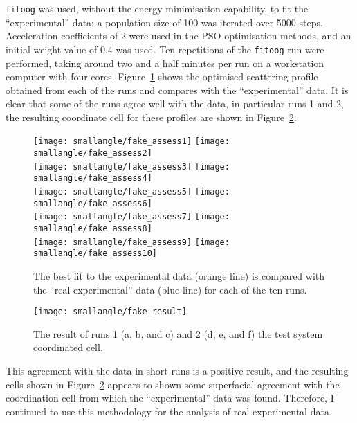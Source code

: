 \texttt{fitoog} was used, without the energy minimisation capability, to fit the ``experimental'' data; a population size of 100 was iterated over 5000 steps.
Acceleration coefficients of 2 were used in the PSO optimisation methods, and an initial weight value of 0.4 was used.
Ten repetitions of the \texttt{fitoog} run were performed, taking around two and a half minutes per run on a workstation computer with four cores.
Figure~\ref{fig:test_assess} shows the optimised scattering profile obtained from each of the runs and compares with the ``experimental'' data.
It is clear that some of the runs agree well with the data, in particular runs 1 and 2, the resulting coordinate cell for these profiles are shown in Figure~\ref{fig:fake_result}.
%
\begin{figure}
    \centering
    \texttt{[image: smallangle/fake\_assess1]}
    \texttt{[image: smallangle/fake\_assess2]} \\
    \texttt{[image: smallangle/fake\_assess3]}
    \texttt{[image: smallangle/fake\_assess4]} \\
    \texttt{[image: smallangle/fake\_assess5]}
    \texttt{[image: smallangle/fake\_assess6]} \\
    \texttt{[image: smallangle/fake\_assess7]}
    \texttt{[image: smallangle/fake\_assess8]} \\
    \texttt{[image: smallangle/fake\_assess9]}
    \texttt{[image: smallangle/fake\_assess10]}
    \caption{The best fit to the experimental data (orange line) is compared with the ``real experimental'' data (blue line) for each of the ten runs.}
    \label{fig:test_assess}
\end{figure}
%
%
\begin{figure}
    \centering
    \texttt{[image: smallangle/fake\_result]}
    \caption{The result of runs 1 (a, b, and c) and 2 (d, e, and f) the test system coordinated cell.}
    \label{fig:fake_result}
\end{figure}
%

This agreement with the data in short runs is a positive result, and the resulting cells shown in Figure~\ref{fig:fake_result} appears to shown some superfacial agreement with the coordination cell from which the ``experimental'' data was found.
Therefore, I continued to use this methodology for the analysis of real experimental data.

